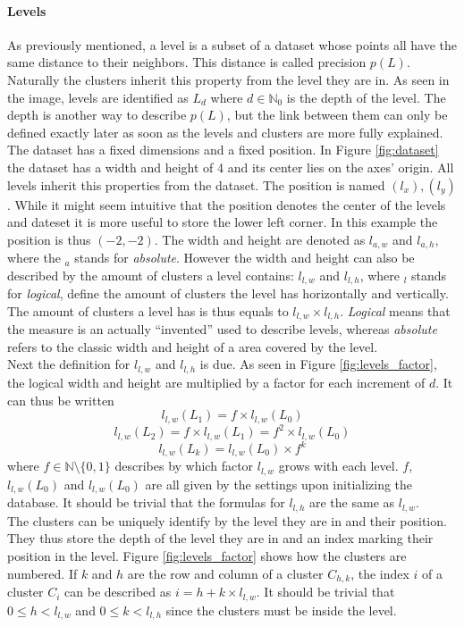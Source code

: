 \documentclass[12pt,a4paper,titlepage]{article}
\begin{document}
	\paragraph{Levels}\label{sec:levels}
	As previously mentioned, a level is a subset of a dataset whose points all have the same distance to their neighbors. This distance is called precision \(p(L)\). Naturally the clusters inherit this property from the level they are in. As seen in the image, levels are identified as \(L_d\) where \(d \in \mathbb{N}_0\) is the depth of the level. The depth is another way to describe \(p(L)\), but the link between them can only be defined exactly later as soon as the levels and clusters are more fully explained.\\
	The dataset has a fixed dimensions and a fixed position. In Figure \ref{fig:dataset} the dataset has a width and height of 4 and its center lies on the axes' origin. All levels inherit this properties from the dataset. The position is named \((l_x),(l_y)\). While it might seem intuitive that the position denotes the center of the levels and dateset it is more useful to store the lower left corner. In this example the position is thus \((-2,-2)\). The width and height are denoted as \(l_{a,w}\) and \(l_{a,h}\), where the \(_a\) stands for \emph{absolute}. However the width and height can also be described by the amount of clusters a level contains: \(l_{l,w}\) and \(l_{l,h}\), where \(_l\) stands for \emph{logical}, define the amount of clusters the level has horizontally and vertically. The amount of clusters a level has is thus equals to \(l_{l,w} \times l_{l,h}\). \emph{Logical} means that the measure is an actually ``invented'' used to describe levels, whereas \emph{absolute} refers to the classic width and height of a area covered by the level.\\
	Next the definition for \(l_{l,w}\) and \(l_{l,h}\) is due. As seen in Figure \ref{fig:levels_factor}, the logical width and height are multiplied by a factor for each increment of \(d\). It can thus be written
	\[l_{l,w}(L_1)= f \times l_{l,w}(L_0)\]
	\[l_{l,w}(L_2)= f \times l_{l,w}(L_1) = f^2 \times l_{l,w}(L_0)\]
	\[l_{l,w}(L_k) = l_{l,w}(L_0) \times f^k\]
	where \(f \in \mathbb{N}\setminus\{0,1\}\) describes by which factor \(l_{l,w}\) grows with each level. \(f\), \(l_{l,w}(L_0)\) and \(l_{l,w}(L_0)\) are all given by the settings upon initializing the database. It should be trivial that the formulas for \(l_{l,h}\) are the same as \(l_{l,w}\).\\
	The clusters can be uniquely identify by the level they are in and their position. They thus store the depth of the level they are in and an index marking their position in the level. Figure \ref{fig:levels_factor} shows how the clusters are numbered. If \(k\) and \(h\) are the row and column of a cluster \(C_{h,k}\), the index \(i\) of a cluster \(C_i\) can be described as \(i = h + k \times l_{l,w}\). It should be trivial that \(0 \leq h < l_{l,w}\) and \(0 \leq k < l_{l,h}\) since the clusters must be inside the level.\\
\end{document}
